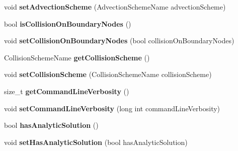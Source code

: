 \begin{DoxyCompactItemize}
\item 
\hypertarget{classnatrium_1_1SolverConfiguration_a4fef165cd5a17247203af08846ec0f31}{void {\bfseries set\-Advection\-Scheme} (Advection\-Scheme\-Name advection\-Scheme)}\label{classnatrium_1_1SolverConfiguration_a4fef165cd5a17247203af08846ec0f31}

\item 
\hypertarget{classnatrium_1_1SolverConfiguration_a8a0bc2d24b247244790f1d50323ace4c}{bool {\bfseries is\-Collision\-On\-Boundary\-Nodes} ()}\label{classnatrium_1_1SolverConfiguration_a8a0bc2d24b247244790f1d50323ace4c}

\item 
\hypertarget{classnatrium_1_1SolverConfiguration_a12179b09400d5502f70c79060e0235bb}{void {\bfseries set\-Collision\-On\-Boundary\-Nodes} (bool collision\-On\-Boundary\-Nodes)}\label{classnatrium_1_1SolverConfiguration_a12179b09400d5502f70c79060e0235bb}

\item 
\hypertarget{classnatrium_1_1SolverConfiguration_a90e61c6fa9387a1cbf5943674bf307a8}{Collision\-Scheme\-Name {\bfseries get\-Collision\-Scheme} ()}\label{classnatrium_1_1SolverConfiguration_a90e61c6fa9387a1cbf5943674bf307a8}

\item 
\hypertarget{classnatrium_1_1SolverConfiguration_a5e7241337aa70cbe4b8af29c9cb5cfe8}{void {\bfseries set\-Collision\-Scheme} (Collision\-Scheme\-Name collision\-Scheme)}\label{classnatrium_1_1SolverConfiguration_a5e7241337aa70cbe4b8af29c9cb5cfe8}

\item 
\hypertarget{classnatrium_1_1SolverConfiguration_ac1954ee6d225807f947222c437fcd6a4}{size\-\_\-t {\bfseries get\-Command\-Line\-Verbosity} ()}\label{classnatrium_1_1SolverConfiguration_ac1954ee6d225807f947222c437fcd6a4}

\item 
\hypertarget{classnatrium_1_1SolverConfiguration_a906afb09b544bf2137c0d3bf9214b4a5}{void {\bfseries set\-Command\-Line\-Verbosity} (long int command\-Line\-Verbosity)}\label{classnatrium_1_1SolverConfiguration_a906afb09b544bf2137c0d3bf9214b4a5}

\item 
\hypertarget{classnatrium_1_1SolverConfiguration_a43270017646e2efa400ae84d644ac897}{bool {\bfseries has\-Analytic\-Solution} ()}\label{classnatrium_1_1SolverConfiguration_a43270017646e2efa400ae84d644ac897}

\item 
\hypertarget{classnatrium_1_1SolverConfiguration_ae23ef2513c7b4ed3eacd678e38ff146f}{void {\bfseries set\-Has\-Analytic\-Solution} (bool has\-Analytic\-Solution)}\label{classnatrium_1_1SolverConfiguration_ae23ef2513c7b4ed3eacd678e38ff146f}


\end{DoxyCompactItemize}
